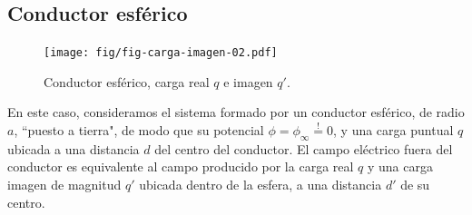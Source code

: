 \subsection{Conductor esférico}
\begin{figure}[!h]
\centerline{\texttt{[image: fig/fig-carga-imagen-02.pdf]}}
\caption{Conductor esférico, carga real $q$ e imagen $q'$.}
\label{ci02}
\end{figure}
En este caso, consideramos el sistema formado por un conductor esférico, de radio $a$, ``puesto a tierra", de modo que su potencial $\phi=\phi_\infty\stackrel{!}{=}0$, y una carga puntual $q$ ubicada a una distancia $d$ del centro del conductor. El campo eléctrico fuera del conductor es equivalente al campo producido por la carga real $q$ y una carga imagen de magnitud $q'$ ubicada dentro de la esfera, a una distancia $d'$ de su centro. 

